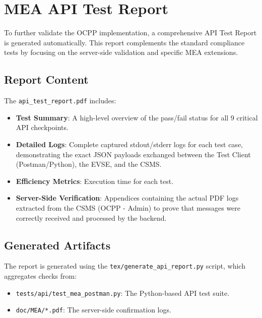 \documentclass[a4paper,11pt]{report}
\begin{document}
\section{MEA API Test Report}
To further validate the OCPP implementation, a comprehensive API Test Report is generated automatically. This report complements the standard compliance tests by focusing on the server-side validation and specific MEA extensions.

\subsection{Report Content}
The \texttt{api\_test\_report.pdf} includes:
\begin{itemize}
    \item \textbf{Test Summary}: A high-level overview of the pass/fail status for all 9 critical API checkpoints.
    \item \textbf{Detailed Logs}: Complete captured stdout/stderr logs for each test case, demonstrating the exact JSON payloads exchanged between the Test Client (Postman/Python), the EVSE, and the CSMS.
    \item \textbf{Efficiency Metrics}: Execution time for each test.
    \item \textbf{Server-Side Verification}: Appendices containing the actual PDF logs extracted from the CSMS (OCPP - Admin) to prove that messages were correctly received and processed by the backend.
\end{itemize}

\subsection{Generated Artifacts}
The report is generated using the \texttt{tex/generate\_api\_report.py} script, which aggregates checks from:
\begin{itemize}
    \item \texttt{tests/api/test\_mea\_postman.py}: The Python-based API test suite.
    \item \texttt{doc/MEA/*.pdf}: The server-side confirmation logs.
\end{itemize}
\end{document}
